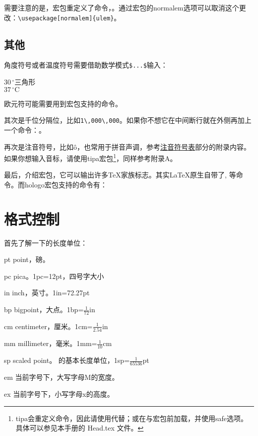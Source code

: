 需要注意的是，宏包重定义了命令，。通过宏包的normalem选项可以取消这个更改：\verb|\usepackage[normalem]{ulem}|。

\subsection{其他}
角度符号或者温度符号需要借助数学模式\verb|$...$|输入：

\begin{codeshow}
$30\,^{\circ}$三角形 \\
$37\,^{\circ}\mathrm{C}$
\end{codeshow}

欧元符可能需要用到宏包支持的命令。

其次是千位分隔位，比如\verb|1\,000\,000|。如果你不想它在中间断行就在外侧再加上一个命令：。

再次是注音符号，比如\^o，也常用于拼音声调，参考\hyperref[app:phonetic]{注音符号表}部分的附录内容。如果你想输入音标，请使用tipa宏包\footnote{tipa会重定义\latexline{!}命令，因此请使用代替；或在与宏包前加载，并使用safe选项。具体可以参见本手册的 Head.tex 文件。}，同样参考附录A。

最后，介绍宏包，它可以输出许多\TeX 家族标志。其实\LaTeX 原生自带了, 等命令。而hologo宏包支持的命令有：

\begin{codeshow}
 
\end{codeshow}

\section{格式控制}
首先了解一下的长度单位：
\begin{fead}
  \item[pt] point，磅。\label{sec:length}
  \item[pc] pica。1pc=12pt，四号字大小
  \item[in] inch，英寸。1in=72.27pt
  \item[bp] bigpoint，大点。1bp=$\frac{1}{72}$in
  \item[cm] centimeter，厘米。1cm=$\frac{1}{2.54}$in
  \item[mm] millimeter，毫米。1mm=$\frac{1}{10}$cm
  \item[sp] scaled point。 的基本长度单位，1sp=$\frac{1}{65536}$pt
  \item[em] 当前字号下，大写字母M的宽度。
  \item[ex] 当前字号下，小写字母x的高度。
\end{fead}

